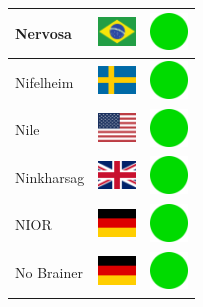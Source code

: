 \documentclass[12pt, a4paper, twoside]{report}
\begin{document}
\begin{center}
\begin{longtable}{|p{5cm}|p{2cm}|p{2cm}|}
Nervosa & \includegraphics[width=1cm]{4x3/br} & \includegraphics[width=1cm]{likes/y} \\ \hline
Nifelheim & \includegraphics[width=1cm]{4x3/se} & \includegraphics[width=1cm]{likes/y} \\ \hline
Nile & \includegraphics[width=1cm]{4x3/us} & \includegraphics[width=1cm]{likes/y} \\ \hline
Ninkharsag & \includegraphics[width=1cm]{4x3/gb} & \includegraphics[width=1cm]{likes/y} \\ \hline
NIOR & \includegraphics[width=1cm]{4x3/de} & \includegraphics[width=1cm]{likes/y} \\ \hline
No Brainer & \includegraphics[width=1cm]{4x3/de} & \includegraphics[width=1cm]{likes/y} \\ \hline

\end{longtable}
\end{center}
\end{document}
